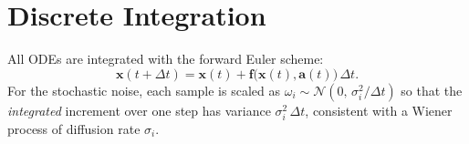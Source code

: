 \documentclass[11pt, a4paper]{article}
\newcommand{\vect}[1]{\bm{#1}}
\begin{document}
\appendix
\section{Discrete Integration}

All ODEs are integrated with the forward Euler scheme:
\begin{equation}
  \vect{x}(t+\Delta t) = \vect{x}(t) + \vect{f}\bigl(\vect{x}(t), \vect{a}(t)\bigr)\,\Delta t.
\end{equation}
For the stochastic noise, each sample is scaled as
$\omega_i \sim \mathcal{N}(0,\,\sigma_i^2/\Delta t)$ so that the
\emph{integrated} increment over one step has variance $\sigma_i^2\,\Delta t$,
consistent with a Wiener process of diffusion rate $\sigma_i$.
\end{document}
